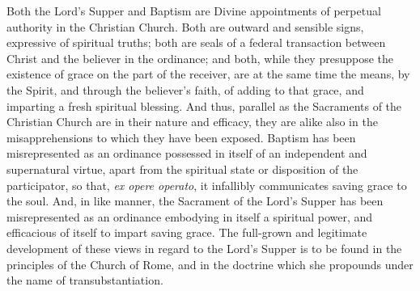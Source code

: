 \documentclass[
]{book}
\begin{document}
Both the Lord's Supper and Baptism are Divine appointments of perpetual authority in the Christian Church. Both are outward and sensible signs, expressive of spiritual truths; both are seals of a federal transaction between Christ and the believer in the ordinance; and both, while they presuppose the existence of grace on the part of the receiver, are at the same time the means, by the Spirit, and through the believer's faith, of adding to that grace, and imparting a fresh spiritual blessing. And thus, parallel as the Sacraments of the Christian Church are in their nature and efficacy, they are alike also in the misapprehensions to which they have been exposed. Baptism has been misrepresented as an ordinance possessed in itself of an independent and supernatural virtue, apart from the spiritual state or disposition of the participator, so that, \foreignlanguage{latin}{\emph{ex opere operato}}, it infallibly communicates saving grace to the soul. And, in like manner, the Sacrament of the Lord's Supper has been misrepresented as an ordinance embodying in itself a spiritual power, and efficacious of itself to impart saving grace. The full-grown and legitimate development of these views in regard to the Lord's Supper is to be found in the principles of the Church of Rome, and in the doctrine which she propounds under the name of transubstantiation.
\end{document}
